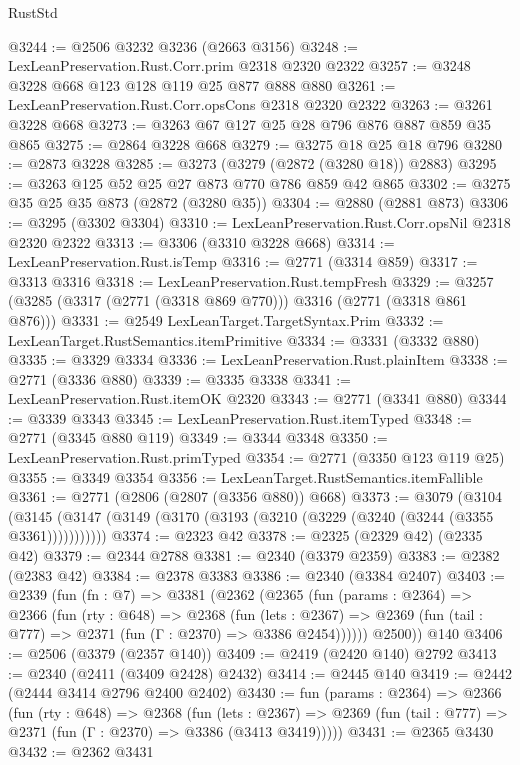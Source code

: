 \begin{lexlean}{RustStd}
\begin{coremodule}
@3244 := @2506 @3232 @3236 (@2663 @3156)
@3248 := LexLeanPreservation.Rust.Corr.prim @2318 @2320 @2322
@3257 := @3248 @3228 @668 @123 @128 @119 @25 @877 @888 @880
@3261 := LexLeanPreservation.Rust.Corr.opsCons @2318 @2320 @2322
@3263 := @3261 @3228 @668
@3273 := @3263 @67 @127 @25 @28 @796 @876 @887 @859 @35 @865
@3275 := @2864 @3228 @668
@3279 := @3275 @18 @25 @18 @796
@3280 := @2873 @3228
@3285 := @3273 (@3279 (@2872 (@3280 @18)) @2883)
@3295 := @3263 @125 @52 @25 @27 @873 @770 @786 @859 @42 @865
@3302 := @3275 @35 @25 @35 @873 (@2872 (@3280 @35))
@3304 := @2880 (@2881 @873)
@3306 := @3295 (@3302 @3304)
@3310 := LexLeanPreservation.Rust.Corr.opsNil @2318 @2320 @2322
@3313 := @3306 (@3310 @3228 @668)
@3314 := LexLeanPreservation.Rust.isTemp
@3316 := @2771 (@3314 @859)
@3317 := @3313 @3316
@3318 := LexLeanPreservation.Rust.tempFresh
@3329 := @3257 (@3285 (@3317 (@2771 (@3318 @869 @770))) @3316 (@2771 (@3318 @861 @876)))
@3331 := @2549 LexLeanTarget.TargetSyntax.Prim
@3332 := LexLeanTarget.RustSemantics.itemPrimitive
@3334 := @3331 (@3332 @880)
@3335 := @3329 @3334
@3336 := LexLeanPreservation.Rust.plainItem
@3338 := @2771 (@3336 @880)
@3339 := @3335 @3338
@3341 := LexLeanPreservation.Rust.itemOK @2320
@3343 := @2771 (@3341 @880)
@3344 := @3339 @3343
@3345 := LexLeanPreservation.Rust.itemTyped
@3348 := @2771 (@3345 @880 @119)
@3349 := @3344 @3348
@3350 := LexLeanPreservation.Rust.primTyped
@3354 := @2771 (@3350 @123 @119 @25)
@3355 := @3349 @3354
@3356 := LexLeanTarget.RustSemantics.itemFallible
@3361 := @2771 (@2806 (@2807 (@3356 @880)) @668)
@3373 := @3079
    (@3104 (@3145 (@3147 (@3149 (@3170 (@3193 (@3210 (@3229 (@3240 (@3244 (@3355 @3361)))))))))))
@3374 := @2323 @42
@3378 := @2325 (@2329 @42) (@2335 @42)
@3379 := @2344 @2788
@3381 := @2340 (@3379 @2359)
@3383 := @2382 (@2383 @42)
@3384 := @2378 @3383
@3386 := @2340 (@3384 @2407)
@3403 := @2339
    (fun (fn : @7) =>
    @3381
      (@2362
        (@2365
          (fun (params : @2364) =>
          @2366
            (fun (rty : @648) =>
            @2368
              (fun (lets : @2367) =>
              @2369 (fun (tail : @777) => @2371 (fun (Γ : @2370) => @3386 @2454))))))
        @2500))
    @140
@3406 := @2506 (@3379 (@2357 @140))
@3409 := @2419 (@2420 @140) @2792
@3413 := @2340 (@2411 (@3409 @2428) @2432)
@3414 := @2445 @140
@3419 := @2442 (@2444 @3414 @2796 @2400 @2402)
@3430 := fun (params : @2364) =>
  @2366
    (fun (rty : @648) =>
    @2368
      (fun (lets : @2367) =>
      @2369 (fun (tail : @777) => @2371 (fun (Γ : @2370) => @3386 (@3413 @3419)))))
@3431 := @2365 @3430
@3432 := @2362 @3431

\end{coremodule}
\end{lexlean}
